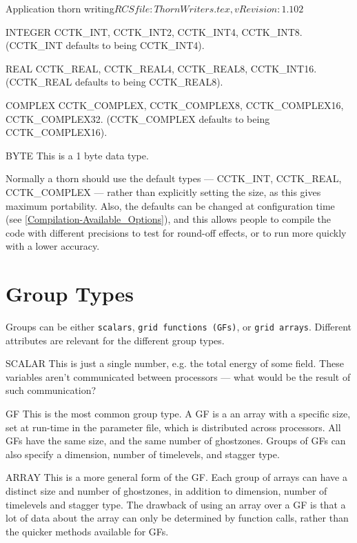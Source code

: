 \begin{cactuspart}{2}{Application thorn writing}{$RCSfile: ThornWriters.tex,v $}{$Revision: 1.102 $}
\begin{Lentry}
\item[INTEGER]
CCTK\_INT, CCTK\_INT2, CCTK\_INT4, CCTK\_INT8.  (CCTK\_INT defaults to being CCTK\_INT4).
\item[REAL]
CCTK\_REAL, CCTK\_REAL4, CCTK\_REAL8, CCTK\_INT16.  (CCTK\_REAL defaults to being CCTK\_REAL8).
\item[COMPLEX]
CCTK\_COMPLEX, CCTK\_COMPLEX8, CCTK\_COMPLEX16, CCTK\_COMPLEX32.
(CCTK\_COMPLEX defaults to being CCTK\_COMPLEX16).
\item[BYTE]
This is a 1 byte data type.
\end{Lentry}

Normally a thorn should use the default types ---
CCTK\_INT, CCTK\_REAL, CCTK\_COMPLEX --- rather than explicitly setting the size, as this gives maximum
portability. Also, the defaults can be changed at configuration time (see
\ref{Compilation-Available_Options}), and this allows people to compile the
code with different precisions to test for round-off effects, or to run more
quickly with a lower accuracy.

\section{Group Types}

Groups can be either {\tt scalars}, {\tt grid functions (GFs)}, or {\tt grid arrays}. Different attributes are relevant for the different group types.

\begin{Lentry}
\item[SCALAR]
This is just a single number, e.g. the total energy of some field.  These
variables aren't communicated between processors --- what would be the
result of such communication?
\item[GF]
This is the most common group type.  A GF is a an array with a
specific size, set at run-time in the parameter file, which is distributed
across processors.  All GFs have the same size, and the same number of
ghostzones. Groups of GFs can also specify a dimension,
number of timelevels, and stagger type.
\item[ARRAY]
This is a more general form of the GF.  Each group of arrays can have
a distinct size and number of ghostzones, in addition to dimension,
number of timelevels and stagger type.
The drawback of using an array over a GF is that a lot of data about the
array can only be determined by function calls, rather than the
quicker methods available for GFs.
\end{Lentry}


\end{cactuspart}
